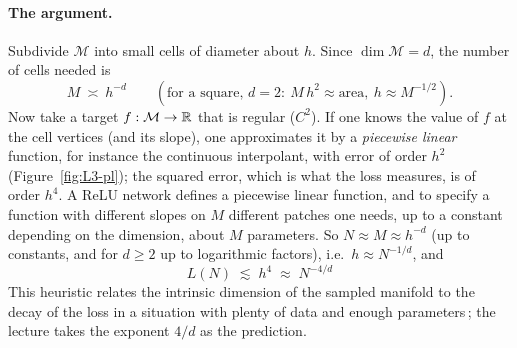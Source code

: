 \paragraph{The argument.}
Subdivide $\mathcal M$ into small cells of diameter about $h$. Since $\dim\mathcal M=d$, the number of cells needed is
\[
   M\ \asymp\ h^{-d}\qquad(\text{for a square, }d=2:\ M\,h^2\approx\text{area},\ h\approx M^{-1/2}).
\]
Now take a target $f:\mathcal M\to\mathbb{R}$ that is regular ($C^2$). If one knows the value of $f$ at the cell vertices (and its slope), one approximates it by a \emph{piecewise linear} function, for instance the continuous interpolant, with error of order $h^2$ (Figure~\ref{fig:L3-pl}); the squared error, which is what the loss measures, is of order $h^4$.
A ReLU network defines a piecewise linear function, and to specify a function with different slopes on $M$ different patches one needs, up to a constant depending on the dimension, about $M$ parameters. So $N\approx M\approx h^{-d}$ (up to constants, and for $d\ge2$ up to logarithmic factors), i.e.\ $h\approx N^{-1/d}$, and
\begin{equation}\label{eq:N4d}
   \boxed{\;L(N)\;\lesssim\;h^{4}\;\approx\;N^{-4/d}\;}
\end{equation}
This heuristic relates the intrinsic dimension of the sampled manifold to the decay of the loss in a situation with plenty of data and enough parameters\,\citep{sharma2022}; the lecture takes the exponent $4/d$ as the prediction.

